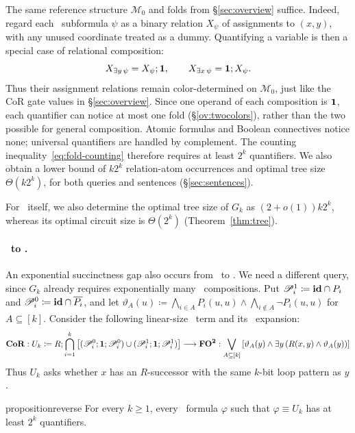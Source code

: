 The same reference structure $\mathcal M_0$ and folds from \S\ref{sec:overview} suffice.
Indeed, regard each \FOtwo\ subformula $\psi$ as a binary relation
$X_\psi$ of assignments to $(x,y)$, with any unused coordinate treated
as a dummy. Quantifying a variable is then a special case of relational
composition:
\[
  X_{\exists y\,\psi}=X_\psi;\mathbf{1},
  \qquad
  X_{\exists x\,\psi}=\mathbf{1};X_\psi.
\]
Thus their assignment relations remain color-determined on $\mathcal M_0$,
just like the CoR gate values in \S\ref{sec:overview}.
Since one operand of each composition is $\mathbf{1}$, each quantifier can
notice at most one fold (\S\ref{ov:twocolors}), rather than the two
possible for general composition. Atomic formulas and Boolean
connectives notice none; universal quantifiers are handled by
complement. The counting inequality~\eqref{eq:fold-counting} therefore
requires at least $2^k$ quantifiers. We also obtain a lower bound of $k2^k$ relation-atom occurrences and
optimal tree size $\Theta(k2^k)$, for both queries and sentences
(\S\ref{sec:sentences}).

For \CoR\ itself, we also determine the optimal tree size of $G_k$
as $(2+o(1))k2^k$, whereas its optimal circuit size is $\Theta(2^k)$
(Theorem~\ref{thm:tree}).

\paragraph{\texorpdfstring{{\boldmath\CoR\ to \FOtwo}}{CoR to FO2}.}
An exponential succinctness gap also occurs from \CoR\ to \FOtwo.
We need a different query, since $G_k$ already requires exponentially
many \CoR\ compositions. Put $\mathscr P_i^1\coloneqq\mathbf{id}\cap P_i$
and $\mathscr P_i^0\coloneqq\mathbf{id}\cap\overline{P_i}$, and let
$\vartheta_A(u)\coloneqq\bigwedge_{i\in A}P_i(u,u)\land
\bigwedge_{i\notin A}\neg P_i(u,u)$ for $A\subseteq[k]$.
Consider the following linear-size \CoR\ term and its \FOtwo\ expansion:
\[
{\boldmath\textbf{\textit{\ensuremath{\mathrm{CoR}}}}}:
 U_k \coloneqq R;\bigcap_{i=1}^k
 \left[(\mathscr P_i^0;\mathbf{1};\mathscr P_i^0)
 \cup(\mathscr P_i^1;\mathbf{1};\mathscr P_i^1)\right]
 \longrightarrow
{\boldmath\textbf{\textit{\ensuremath{\mathrm{FO}^{2}}}}}:
 \bigvee_{A\subseteq[k]}
 \left[\vartheta_A(y)\land\exists y\,
    (R(x,y)\land\vartheta_A(y))\right]
\]
Thus $U_k$ asks whether $x$ has an $R$-successor with the same
$k$-bit loop pattern as $y$.
\begin{restatable}{proposition}{reverse}\label{prop:reverse}
For every $k\ge1$, every \FOtwo\ formula
$\varphi$ such that $\varphi\equiv U_k$ has at least
$2^k$ quantifiers.
\end{restatable}

